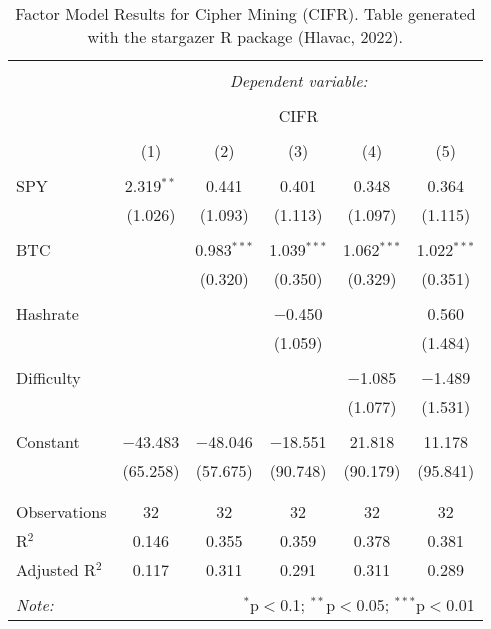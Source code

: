 
\begin{table}[!htbp] \centering 
  \caption{Factor Model Results for Cipher Mining (CIFR). Table generated with the stargazer R package (Hlavac, 2022).} 
  \label{ModelResults_CIFR} 
\large 
\begin{tabular}{@{\extracolsep{5pt}}lccccc} 
\\[-1.8ex]\hline 
\hline \\[-1.8ex] 
 & \multicolumn{5}{c}{\textit{Dependent variable:}} \\ 
\cline{2-6} 
\\[-1.8ex] & \multicolumn{5}{c}{CIFR} \\ 
\\[-1.8ex] & (1) & (2) & (3) & (4) & (5)\\ 
\hline \\[-1.8ex] 
 SPY & 2.319$^{**}$ & 0.441 & 0.401 & 0.348 & 0.364 \\ 
  & (1.026) & (1.093) & (1.113) & (1.097) & (1.115) \\ 
  & & & & & \\ 
 BTC &  & 0.983$^{***}$ & 1.039$^{***}$ & 1.062$^{***}$ & 1.022$^{***}$ \\ 
  &  & (0.320) & (0.350) & (0.329) & (0.351) \\ 
  & & & & & \\ 
 Hashrate &  &  & $-$0.450 &  & 0.560 \\ 
  &  &  & (1.059) &  & (1.484) \\ 
  & & & & & \\ 
 Difficulty &  &  &  & $-$1.085 & $-$1.489 \\ 
  &  &  &  & (1.077) & (1.531) \\ 
  & & & & & \\ 
 Constant & $-$43.483 & $-$48.046 & $-$18.551 & 21.818 & 11.178 \\ 
  & (65.258) & (57.675) & (90.748) & (90.179) & (95.841) \\ 
  & & & & & \\ 
\hline \\[-1.8ex] 
Observations & 32 & 32 & 32 & 32 & 32 \\ 
R$^{2}$ & 0.146 & 0.355 & 0.359 & 0.378 & 0.381 \\ 
Adjusted R$^{2}$ & 0.117 & 0.311 & 0.291 & 0.311 & 0.289 \\ 
\hline 
\hline \\[-1.8ex] 
\textit{Note:}  & \multicolumn{5}{r}{$^{*}$p$<$0.1; $^{**}$p$<$0.05; $^{***}$p$<$0.01} \\ 
\end{tabular} 
\end{table} 
